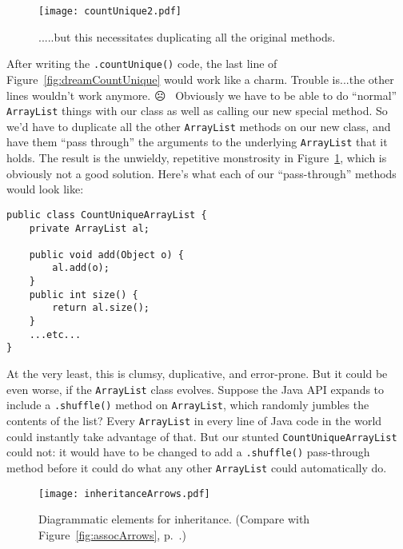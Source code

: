 \begin{figure}
\centering
\texttt{[image: countUnique2.pdf]}  %
\caption{.....but this necessitates duplicating all the original methods.}
\label{fig:countUnique2}
\end{figure}


After writing the \texttt{.countUnique()} code, the last line of
Figure~\ref{fig:dreamCountUnique} would work like a charm. Trouble is...the
other lines wouldn't work anymore. $\frownie$ \ Obviously we have to be able to
do ``normal'' \texttt{ArrayList} things with our class as well as calling our
new special method. So we'd have to duplicate all the other \texttt{ArrayList}
methods on our new class, and have them ``pass through'' the arguments to the
underlying \texttt{ArrayList} that it holds. The result is the unwieldy,
repetitive monstrosity in Figure~\ref{fig:countUnique2}, which is obviously not
a good solution. Here's what each of our ``pass-through'' methods would look
like:

\begin{Verbatim}[fontsize=\small,samepage=true,frame=single]
public class CountUniqueArrayList {
    private ArrayList al;

    public void add(Object o) {
        al.add(o);
    }
    public int size() {
        return al.size();
    }
    ...etc...
}\end{Verbatim}

At the very least, this is clumsy, duplicative, and error-prone. But it could
be even worse, if the \texttt{ArrayList} class evolves. Suppose the Java API
expands to include a \texttt{.shuffle()} method on \texttt{ArrayList}, which
randomly jumbles the contents of the list? Every \texttt{ArrayList} in every
line of Java code in the world could instantly take advantage of that. But our
stunted \texttt{CountUniqueArrayList} could not: it would have to be changed
to add a \texttt{.shuffle()} pass-through method before it could do what any
other \texttt{ArrayList} could automatically do.

\label{page:inheritanceArrows}
\begin{figure}[h]
\centering
\texttt{[image: inheritanceArrows.pdf]}
\caption{Diagrammatic elements for inheritance. (Compare with
Figure~\ref{fig:assocArrows}, p.~\pageref{fig:assocArrows}.)}
\label{fig:inheritanceArrows}
\end{figure}

